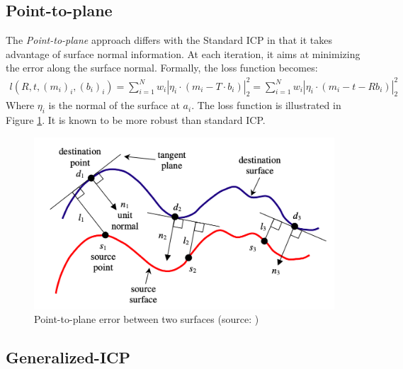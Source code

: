 \documentclass[11pt,letterpaper,leqno]{article}
\begin{document}
\subsection{Point-to-plane}
The \textit{Point-to-plane} approach differs with the Standard ICP in that it takes advantage of surface normal information. At each iteration, it aims at minimizing the error along the surface normal. Formally, the loss function becomes:
\begin{align*}
    l(R,t, (m_i)_i, (b_i)_i) = \sum_{i=1}^N w_i |\eta_i \cdot (m_i - T \cdot b_i)|_2^2 = \sum_{i=1}^N w_i |\eta_i \cdot (m_i - t - R b_i)|_2^2
\end{align*}
Where $\eta_i$ is the normal of the surface at $a_i$. The loss function is illustrated in Figure \ref{fig:point2plane}. It is known to be more robust than standard ICP.
\begin{figure}[ht!]
    \centering
    \includegraphics[width=0.7\linewidth]{img/point2plane.png}
    \caption{Point-to-plane error between two surfaces (source: \cite{point2plane})}
    \label{fig:point2plane}
\end{figure}

\subsection{Generalized-ICP} \label{seq:gen-icp}
\end{document}
